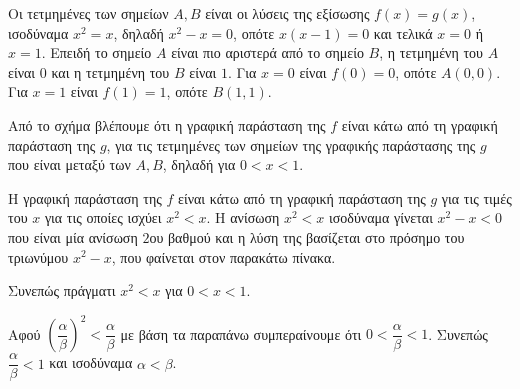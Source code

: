 
\begin{alist}
\item Οι τετμημένες των σημείων $A, B$ είναι οι λύσεις της εξίσωσης $f(x) = g(x)$, ισοδύναμα $x^2 = x$, δηλαδή $x^2 - x = 0$, οπότε $x(x - 1) = 0$ και τελικά $x = 0$ ή $x = 1$.
Επειδή το σημείο $A$ είναι πιο αριστερά από το σημείο $B$, η τετμημένη του $A$ είναι $0$ και η τετμημένη του $B$ είναι $1$.
Για $x = 0$ είναι $f(0) = 0$, οπότε $A(0,0)$.
Για $x = 1$ είναι $f(1) = 1$, οπότε $B(1,1)$.

\item 
\begin{rlist}
\item Από το σχήμα βλέπουμε ότι η γραφική παράσταση της $f$ είναι κάτω από τη
γραφική παράσταση της $g$, για τις τετμημένες των σημείων της γραφικής παράστασης της $g$ που είναι μεταξύ των $A, B$, δηλαδή για $0 < x < 1$.
\item Η γραφική παράσταση της $f$ είναι κάτω από τη γραφική παράσταση της $g$ για
τις τιμές του $x$ για τις οποίες ισχύει $x^2 < x$. Η ανίσωση $x^2 < x$ ισοδύναμα γίνεται $x^2 - x < 0$ που είναι μία ανίσωση $2$ου βαθμού και η λύση της βασίζεται
στο πρόσημο του τριωνύμου $x^2 - x$, που φαίνεται στον παρακάτω πίνακα.
\begin{center}
\end{center}
Συνεπώς πράγματι $x^2 < x$ για $0 < x < 1$.
\end{rlist}

\item Αφού $\left(\dfrac{\alpha}{\beta}\right)^2 < \dfrac{\alpha}{\beta}$ με βάση τα παραπάνω συμπεραίνουμε ότι $0 < \dfrac{\alpha}{\beta} < 1$. Συνεπώς $\dfrac{\alpha}{\beta} < 1$ και ισοδύναμα $\alpha < \beta$.
\end{alist}

